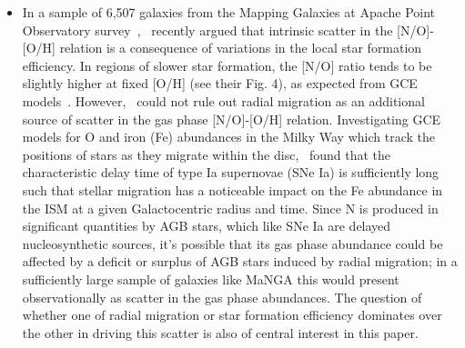 \documentclass[ms.tex]{subfiles}
\begin{document}
\begin{itemize}
	\item In a sample of 6,507 galaxies from the Mapping Galaxies at Apache 
	Point Observatory survey~\citep[MaNGA;][]{Bundy2015},~\citet{Schaefer2020} 
	recently argued that intrinsic scatter in the [N/O]-[O/H] relation is a 
	consequence of variations in the local star formation efficiency. 
	In regions of slower star formation, the [N/O] ratio tends to be slightly 
	higher at fixed [O/H] (see their Fig. 4), as expected from GCE 
	models~\citep[e.g.][]{Molla2006, Vincenzo2016}. 
	However,~\citet{Schaefer2020} could not rule out radial migration as an 
	additional source of scatter in the gas phase [N/O]-[O/H] relation. 
	Investigating GCE models for O and iron (Fe) abundances in the Milky Way 
	which track the positions of stars as they migrate within the 
	disc,~\citet{Johnson2021} found that the characteristic delay time of type 
	Ia supernovae (SNe Ia) is sufficiently long such that stellar migration 
	has a noticeable impact on the Fe abundance in the ISM at a given 
	Galactocentric radius and time. 
	Since N is produced in significant quantities by AGB stars, which like SNe 
	Ia are delayed nucleosynthetic sources, it's possible that its gas phase 
	abundance could be affected by a deficit or surplus of AGB stars induced 
	by radial migration; in a sufficiently large sample of galaxies like MaNGA 
	this would present observationally as scatter in the gas phase abundances. 
	The question of whether one of radial migration or star formation 
	efficiency dominates over the other in driving this scatter is also of 
	central interest in this paper. 
\end{itemize} 
\end{document}
